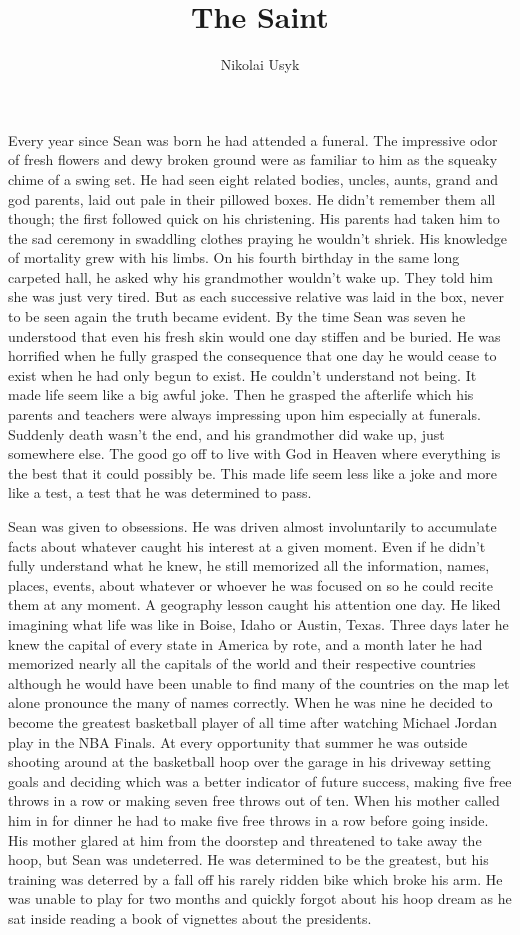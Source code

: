 \documentclass[12pt]{article}
\title{The Saint}
\author{Nikolai Usyk}
\date{}
\begin{document}
	
\maketitle

Every year since Sean was born he had attended a funeral. The impressive odor of fresh flowers and dewy broken ground were as familiar to him as the squeaky chime of a swing set. He had seen eight related bodies, uncles, aunts, grand and god parents, laid out pale in their pillowed boxes. He didn’t remember them all though; the first followed quick on his christening. His parents had taken him to the sad ceremony in swaddling clothes praying he wouldn’t shriek. His knowledge of mortality grew with his limbs. On his fourth birthday in the same long carpeted hall, he asked why his grandmother wouldn’t wake up. They told him she was just very tired. But as each successive relative was laid in the box, never to be seen again the truth became evident. By the time Sean was seven he understood that even his fresh skin would one day stiffen  and  be buried. He was horrified  when  he fully grasped  the consequence that one day he would cease to exist when he had only begun to exist. He couldn’t understand not being. It made life seem like a big awful joke. Then he grasped the afterlife which his parents and teachers were always impressing upon him especially at funerals. Suddenly death wasn’t the end, and his grandmother did wake up, just somewhere else. The good go off to live with God in Heaven where everything is the best that it could possibly be. This made life seem less like a joke and more like a test, a test that he was determined to pass.

Sean was given to obsessions. He was driven almost involuntarily to accumulate facts about whatever caught his interest at a given moment. Even if he didn’t fully understand what he knew, he still memorized all the information, names, places, events, about whatever or whoever he was focused on so he could recite them at any moment. A geography lesson caught his attention one day. He liked imagining what life was like in Boise, Idaho or Austin, Texas. Three days later he knew the capital of every state in America by rote, and a month later he had memorized nearly all the capitals of the world and their respective countries although he would have been unable to find many of the countries on the map let alone pronounce the many of names correctly. When he was nine he decided to become the greatest basketball player of all time after watching Michael Jordan play in the NBA Finals. At every opportunity that summer he was outside shooting around at the basketball hoop over the garage in his driveway setting goals and deciding which was a better indicator of future success, making five free throws in a row or making seven free throws out of ten. When his mother called him in for dinner he had to make five free throws in a row before going inside. His mother glared at him from the doorstep and threatened to take away the hoop, but Sean was undeterred. He was determined to be the greatest, but his training was deterred by a fall off his rarely ridden bike which broke his arm.  He was unable to play for two months and quickly forgot about his hoop dream as he sat inside reading a book of vignettes about the presidents.
\end{document}
